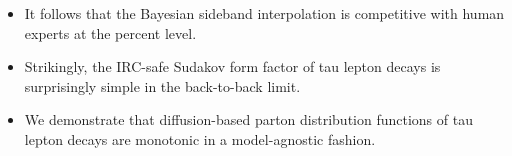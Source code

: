 \begin{itemize}
  \item It follows that the Bayesian sideband interpolation is competitive with human experts at the percent level.
  \item Strikingly, the IRC-safe Sudakov form factor of tau lepton decays is surprisingly simple in the back-to-back limit. \softfunc
  \item We demonstrate that diffusion-based parton distribution functions of tau lepton decays are monotonic in a model-agnostic fashion.
\end{itemize}

